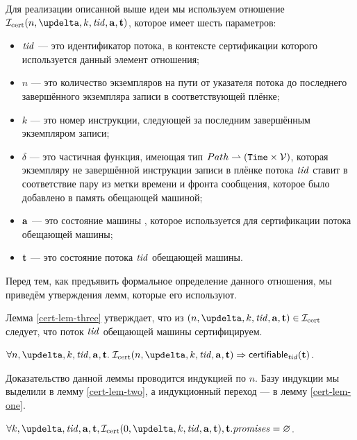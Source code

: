 
Для реализации описанной выше идеи мы используем отношение
$\invCert(n, \delta, k, \tId, \aT, \tT)$, которое имеет шесть параметров:
\begin{itemize}
  \item $\mathit{tid}$ --- это идентификатор потока, в контексте сертификации которого используется данный элемент отношения;
  \item $n$ --- это количество экземпляров на пути от указателя потока до последнего завершённого экземпляра записи в
    соответствующей плёнке;
  \item $k$ --- это номер инструкции, следующей за последним завершённым экземпляром записи;
  \item $\delta$ --- это частичная функция, имеющая тип $Path \rightharpoonup (\mathtt{Time} \times \mathcal{V})$,
    которая экземпляру не завершённой инструкции записи в плёнке потока $\mathit{tid}$ ставит в соответствие
    пару из метки времени и фронта сообщения, которое
    было добавлено в память обещающей машиной;
  \item $\mathbf{a}$ --- это состояние машины \ARMt, которое используется для сертификации потока обещающей машины;
  \item $\mathbf{t}$ --- это состояние потока $\mathit{tid}$ обещающей машины.
\end{itemize}
Перед тем, как предъявить формальное определение данного отношения, мы приведём утверждения лемм, которые
его используют.

Лемма \ref{cert-lem-three} утверждает, что из $(n, \delta, k, \tId, \aT, \tT) \in \invCert$ следует,
что поток $\mathit{tid}$ обещающей машины сертифицируем.
\begin{lemma}
\label{cert-lem-three}
$\forall n, \delta, k, \tId, \aT, \tT. \; \invCert(n, \delta, k, \tId, \aT, \tT) \Rightarrow \certifiableTid(\tT)$.
\end{lemma}
Доказательство данной леммы проводится индукцией по $n$.
Базу индукции мы выделили в лемму \ref{cert-lem-two}, а индукционный переход --- в лемму \ref{cert-lem-one}.

\begin{lemma}
\label{cert-lem-two}
$\forall k, \delta, \tId, \aT, \tT, \invCert(0, \delta, k, \tId, \aT, \tT), \tT.\PromSet = \emptyset$.
\end{lemma}

